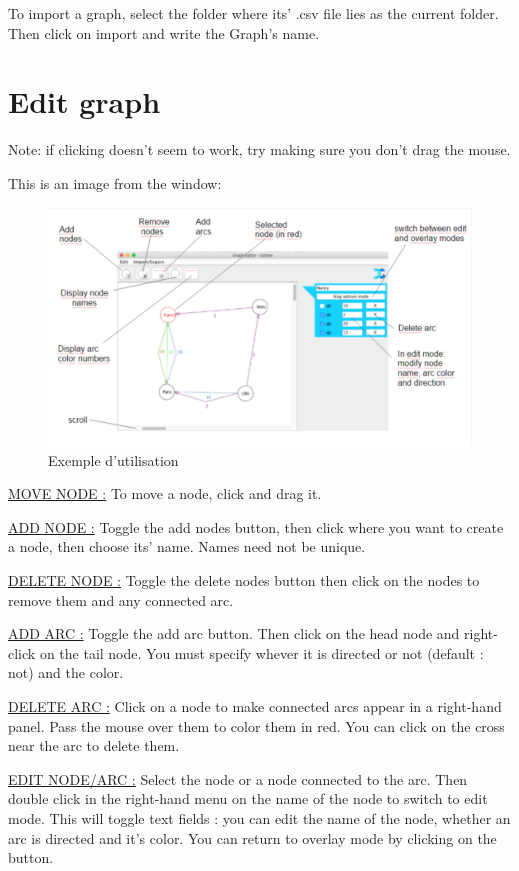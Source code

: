 \documentclass[pidr]{tnreport}
\begin{document}
To import a graph, select the folder where its’ .csv file lies as the current folder. Then click on import and write the Graph’s name.

\section{Edit graph} 

Note: if clicking doesn’t seem to work, try making sure you don’t drag the mouse.

This is an image from the window:

\begin{figure}[h]
  \centering
  \includegraphics[width=17cm]{figures/exemples/utilisation_application}
  \caption{Exemple d'utilisation}
  \label{fig:utilisation_application}
\end{figure}

\underline{MOVE NODE :}
To move a node, click and drag it.

\underline{ADD NODE :} 
Toggle the add nodes button, then click where you want to create a node, then choose its’ name. Names need not be unique.

\underline{DELETE NODE :}
Toggle the delete nodes button then click on the nodes to remove them and any connected arc.

\underline{ADD ARC :}
Toggle the add arc button. Then click on the head node and right-click on the tail node. You must specify whever it is directed or not (default : not) and the color.

\underline{DELETE ARC :}
Click on a node to make connected arcs appear in a right-hand panel. Pass the mouse over them to color them in red. You can click on the cross near the arc  to delete them.

\underline{EDIT NODE/ARC :}
Select the node or a node connected to the arc. Then double click in the right-hand menu on the name of the node to switch to edit mode. This will toggle text fields : you can edit the name of the node, whether an arc is directed and it’s color. You can return to overlay mode by clicking on the button.
\end{document}
